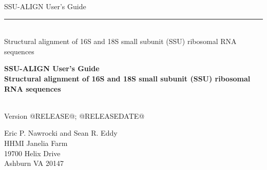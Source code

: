 \begin{titlepage}
{\Large

\vspace*{\fill}

\begin{latexonly}
\noindent
{\Huge \textsf{SSU-ALIGN User's Guide}} \\ 
\rule[2pt]{\textwidth}{1pt} \\
\hspace*{\fill} {\large \textsf{Structural alignment of 16S and 18S small subunit
    (SSU) ribosomal RNA sequences}\\}
\end{latexonly}

\begin{htmlonly}
\begin{center}
{\Huge \textbf{SSU-ALIGN User's Guide}}\\
{\large \textbf{Structural alignment of 16S and 18S small subunit
    (SSU) ribosomal RNA sequences}}\\
\end{center}
\end{htmlonly}

\vspace*{\fill}

\begin{center}
\textsl{}\\
Version @RELEASE@; @RELEASEDATE@ \\ 

\vspace*{\fill}

Eric P. Nawrocki and Sean R. Eddy\\
HHMI Janelia Farm\\
19700 Helix Drive\\
Ashburn VA 20147\\
\textsl{} \\
\end{center}

\vspace*{\fill}

}
\end{titlepage}
